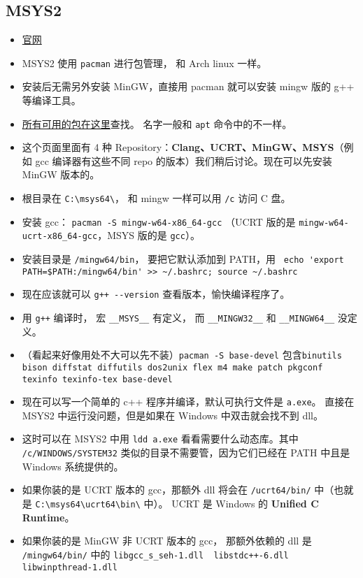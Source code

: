 \subsection{MSYS2}
\begin{itemize}
\item \href{https://www.msys2.org/}{官网}
\item MSYS2 使用 \verb`pacman` 进行包管理， 和 Arch linux 一样。
\item 安装后无需另外安装 MinGW，直接用 pacman 就可以安装 mingw 版的 g++ 等编译工具。
\item \href{https://packages.msys2.org/queue}{所有可用的包在这里}查找。 名字一般和 \verb|apt| 命令中的不一样。
\item 这个页面里面有 4 种 Repository：\textbf{Clang、UCRT、MinGW、MSYS}（例如 gcc 编译器有这些不同 repo 的版本）我们稍后讨论。现在可以先安装 MinGW 版本的。
\item 根目录在 \verb|C:\msys64\|， 和 mingw 一样可以用 \verb|/c| 访问 C 盘。
\item 安装 gcc： \verb`pacman -S mingw-w64-x86_64-gcc` （UCRT 版的是 \verb`mingw-w64-ucrt-x86_64-gcc`，MSYS 版的是 \verb`gcc`）。
\item 安装目录是 \verb`/mingw64/bin`， 要把它默认添加到 PATH，用 \verb` echo 'export PATH=$PATH:/mingw64/bin' >> ~/.bashrc; source ~/.bashrc`
\item 现在应该就可以 \verb`g++ --version` 查看版本，愉快编译程序了。
\item 用 \verb|g++| 编译时， 宏 \verb|__MSYS__| 有定义， 而 \verb|__MINGW32__| 和 \verb|__MINGW64__| 没定义。
\item （看起来好像用处不大可以先不装）\verb|pacman -S base-devel| 包含\verb`binutils bison diffstat diffutils dos2unix flex m4 make patch pkgconf texinfo texinfo-tex base-devel`
\item 现在可以写一个简单的 c++ 程序并编译，默认可执行文件是 \verb`a.exe`。 直接在 MSYS2 中运行没问题，但是如果在 Windows 中双击就会找不到 dll。
\item 这时可以在 MSYS2 中用 \verb`ldd a.exe` 看看需要什么动态库。其中 \verb`/c/WINDOWS/SYSTEM32` 类似的目录不需要管，因为它们已经在 PATH 中且是 Windows 系统提供的。
\item 如果你装的是 UCRT 版本的 gcc，那额外 dll 将会在 \verb`/ucrt64/bin/` 中（也就是 \verb`C:\msys64\ucrt64\bin\` 中）。 UCRT 是 Windows 的 \textbf{Unified C Runtime}。
\item 如果你装的是 MinGW 非 UCRT 版本的 gcc， 那额外依赖的 dll 是 \verb`/mingw64/bin/` 中的 \verb`libgcc_s_seh-1.dll  libstdc++-6.dll  libwinpthread-1.dll`

\end{itemize}
